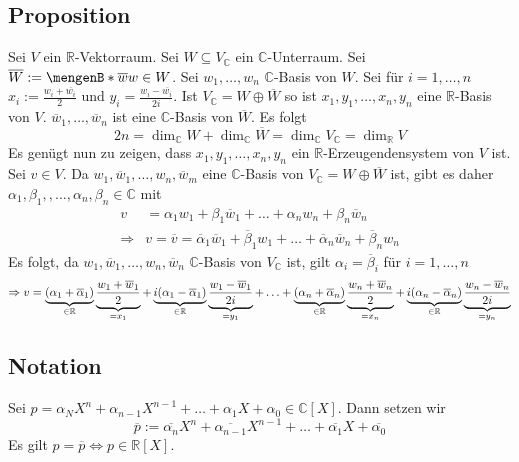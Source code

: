 \subsection[Proposition: Erhalten einer $\mathds{R}$-Basis von $V$ durch die Komplemente von $V_\mathds{C}$]{Proposition} %
\label{sub:11.4}
Sei $V$ ein $\mathds{R}$-Vektorraum. Sei $W	\subseteq V_\mathds{C}$ ein $\mathds{C}$-Unterraum. Sei $\overline{W} := \set[\overline{w}]{w \in W}$. Sei 
$w_1, \ldots , w_n$ $\mathds{C}$-Basis von $W$. Sei für $i=1, \ldots ,n$ $x_i := \frac{w_i + \overline{w_i} }{2}$ und $y_i = \frac{w_i - \overline{w_i} }{2i}$.
Ist $V_\mathds{C}= W \oplus \overline{W}$ so ist $x_1, y_1, \ldots , x_n, y_n$ eine $\mathds{R}$-Basis von $V$.
$\overline{w}_1 , \ldots , \overline{w}_n$ ist eine $\mathds{C}$-Basis von $\overline{W}$. Es folgt 
\[
	2 n = \dim_\mathds{C} W + \dim_\mathds{C} \overline{W} = \dim_\mathds{C} V_\mathds{C} = \dim_\mathds{R} V
\]
Es genügt nun zu zeigen, dass $x_1, y_1, \ldots , x_n, y_n$ ein $\mathds{R}$-Erzeugendensystem von $V$ ist. Sei $v \in V$. Da 
$w_1, \overline{w}_1 , \ldots , w_n, \overline{w}_m $ eine $\mathds{C}$-Basis von $V_\mathds{C} = W \oplus \overline{W} $ ist, gibt es daher 
$\alpha_1, \beta_1, , \ldots , \alpha_n , \beta_n \in \mathds{C}$ mit 
\begin{align*}
	v &= \alpha_1 w_1 + \beta_1 \overline{w}_1 + \ldots  + \alpha_n w_n + \beta_n \overline{w}_n  \\
	\Rightarrow & v= \overline{v} = \overline{\alpha}_1 \overline{w}_1 + \overline{\beta}_1 w_1 + \ldots + \overline{\alpha}_n \overline{w}_n + \overline{\beta}_n w_n      
\end{align*}
Es folgt, da $w_1, \overline{w}_1, \ldots , w_n, \overline{w}_n $ $\mathds{C}$-Basis von $V_\mathds{C}$ ist, gilt $\alpha_i = \overline{\beta}_i $ für $i=1, \ldots ,n$
\[
	\Rightarrow v = \underbrace{(\alpha_1 + \overline{\alpha}_1 )}_{\in \mathbb{R}} \underbrace{\frac{w_1 + \overline{w}_1 }{2}}_{= x_1} + \underbrace{i (\alpha_1 - \overline{\alpha}_1 )}_{\in \mathbb{R}} \underbrace{\frac{w_1 - \overline{w}_1 }{2i}}_{=y_1}    + \ldots + \underbrace{(\alpha_n + \overline{\alpha}_n )}_{\in \mathbb{R}} \underbrace{\frac{w_n + \overline{w}_n }{2}}_{=x_n} + \underbrace{i (\alpha_n - \overline{\alpha}_n )}_{\in \mathbb{R}} \underbrace{\frac{w_n - \overline{w}_n }{2i} }_{=y_n} 
\]
\bewende

\subsection[Notation: komplex konjugiertes Polynom]{Notation} %
\label{sub:115}
Sei $p= \alpha_N X^n + \alpha_{n-1} X^{n-1} + \ldots  + \alpha_1 X + \alpha_0 \in \mathds{C}[X]$. Dann setzen wir
\[
	\overline{p} := \overline{\alpha_n} X^n + \overline{\alpha_{n-1}} X^{n-1} + \ldots + \overline{\alpha_1} X + \overline{\alpha_0}     
\]
Es gilt $p = \overline{p} \iff p \in \mathds{R}[X] $.

